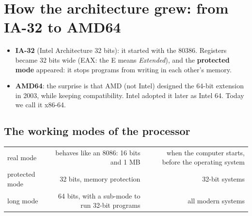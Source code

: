 \section{How the architecture grew: from IA-32 to AMD64}

\begin{center}
\end{center}

\begin{itemize}
    \item \textbf{IA-32} (Intel Architecture 32 bits): it started with the 80386. Registers became 32 bits wide
          (EAX: the E means \emph{Extended}), and the \textbf{protected mode} appeared: it stops programs from writing in each other's memory.
    \item \textbf{AMD64}: the surprise is that AMD (not Intel) designed the 64-bit extension in 2003, while keeping
          compatibility. Intel adopted it later as Intel 64. Today we call it x86-64.
\end{itemize}

\subsection{The working modes of the processor}
\begin{center}
\small
\begin{tabularx}{\linewidth}{|>{\centering\arraybackslash}p{3.3cm}|R|R|}
    \hline
     &  &  \\ \hline
    real mode & behaves like an 8086: 16 bits and 1 MB & when the computer starts, before the operating system \\ \hline
    protected mode & 32 bits, memory protection & 32-bit systems \\ \hline
    long mode & 64 bits, with a sub-mode to run 32-bit programs & all modern systems \\ \hline
\end{tabularx}
\end{center}

